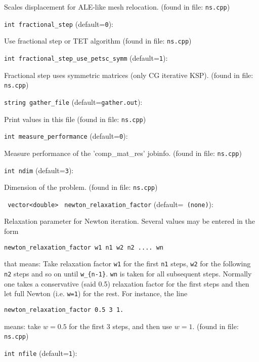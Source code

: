 Scales displacement for ALE-like mesh relocation. 
 (found in file: \verb+ns.cpp+)
\item\verb+int fractional_step+ {\rm(default=\verb|0|)}:

Use fractional step or TET algorithm
 (found in file: \verb+ns.cpp+)
\item\verb+int fractional_step_use_petsc_symm+ {\rm(default=\verb|1|)}:

Fractional step uses symmetric matrices (only CG iterative KSP).
 (found in file: \verb+ns.cpp+)
\item\verb+string gather_file+ {\rm(default=\verb|gather.out|)}:

Print values in this file 
 (found in file: \verb+ns.cpp+)
\item\verb+int measure_performance+ {\rm(default=\verb|0|)}:

Measure performance of the 'comp\_mat\_res' jobinfo. 
 (found in file: \verb+ns.cpp+)
\item\verb+int ndim+ {\rm(default=\verb|3|)}:

Dimension of the problem.
 (found in file: \verb+ns.cpp+)
\item\verb+ vector<double>+ \verb+ newton_relaxation_factor+ {\rm(default=\verb| (none)|)}:

Relaxation parameter for Newton iteration. Several
values may be entered in the form
%
\begin{verbatim} 
newton_relaxation_factor w1 n1 w2 n2 .... wn
\end{verbatim}
%
that means: Take relaxation factor \verb+w1+
for the first \verb+n1+ steps, \verb+w2+ for the following \verb+n2+ steps
and so on until \verb+w_{n-1}+. \verb+wn+ is taken for all subsequent 
steps. Normally one takes a conservative (said 0.5) relaxation
factor for the first steps and then let full Newton (i.e. \verb+w=1+)
for the rest. For instance, the line  
%
\begin{verbatim} 
newton_relaxation_factor 0.5 3 1.
\end{verbatim}
%
means: take $w=0.5$ for the first 3 steps, and then use $w=1$. 
 (found in file: \verb+ns.cpp+)
\item\verb+int nfile+ {\rm(default=\verb|1|)}:


